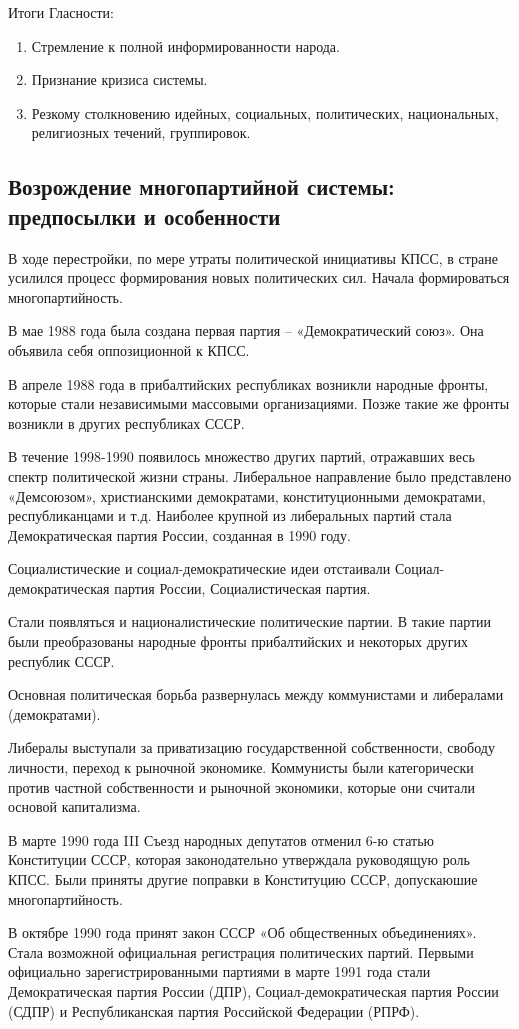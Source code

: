\documentclass{article}
\begin{document}
Итоги Гласности:

\begin{enumerate}
    \item Стремление к полной информированности народа.
    \item Признание кризиса системы.
    \item Резкому столкновению идейных, социальных, политических, национальных, религиозных течений, группировок.
\end{enumerate}

\pagebreak
\subsection{Возрождение многопартийной системы: предпосылки и особенности}

В ходе перестройки, по мере утраты политической инициативы КПСС, в стране усилился процесс формирования новых политических сил. Начала формироваться многопартийность.

В мае 1988 года была создана первая партия – «Демократический союз». Она объявила себя оппозиционной к КПСС.

В апреле 1988 года в прибалтийских республиках возникли народные фронты, которые стали независимыми массовыми организациями. Позже такие же фронты возникли в других республиках СССР.

\hfill

В течение 1998-1990 появилось множество других партий, отражавших весь спектр политической жизни страны.
Либеральное направление было представлено «Демсоюзом», христианскими демократами, конституционными демократами,  республиканцами и т.д. Наиболее крупной из либеральных партий стала Демократическая партия России, созданная в 1990 году.

Социалистические и социал-демократические идеи отстаивали Социал-демократическая партия России, Социалистическая партия.

Стали появляться и националистические политические партии. В такие партии были преобразованы народные фронты прибалтийских и некоторых других республик СССР.

Основная политическая борьба развернулась между коммунистами и либералами (демократами).

Либералы выступали за приватизацию государственной собственности, свободу личности, переход к рыночной экономике. Коммунисты были категорически против частной собственности и рыночной экономики, которые они считали основой капитализма.

\hfill

В марте 1990 года III Съезд народных депутатов отменил 6-ю статью Конституции СССР, которая законодательно утверждала руководящую роль КПСС. Были приняты другие поправки в Конституцию СССР, допускаюшие многопартийность.

В октябре 1990 года принят закон СССР «Об общественных объединениях». Стала возможной официальная регистрация политических партий. Первыми официально зарегистрированными партиями в марте 1991 года стали Демократическая партия России (ДПР), Социал-демократическая партия России (СДПР) и Республиканская партия Российской Федерации (РПРФ).
\end{document}
